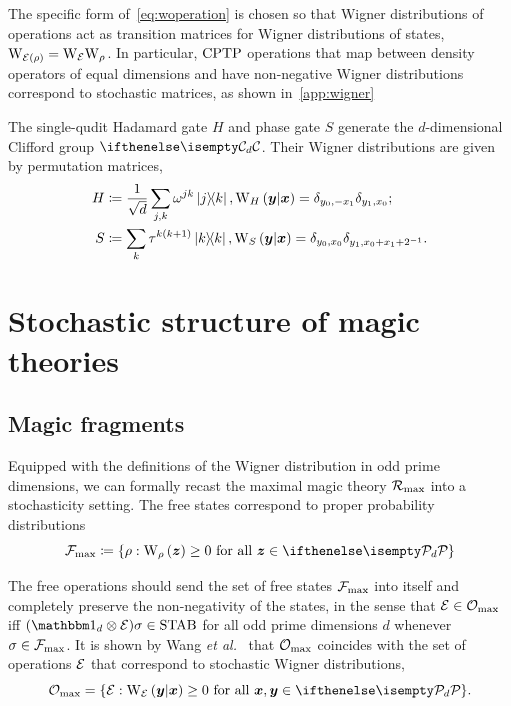 \documentclass[pra,
aps,
twocolumn,
superscriptaddress,
groupedaddress,
nofootinbib,
reprint
]{revtex4-1}
\begin{document}
The specific form of~\cref{eq:woperation} is chosen so that Wigner distributions of operations act as transition matrices for Wigner distributions of states, $\W{\E(\rho)} = \W{\E}\W{\rho}$.
In particular, ${\rm{CPTP}}$ operations that map between density operators of equal dimensions and have non-negative Wigner distributions correspond to stochastic matrices, as shown in~\cref{app:wigner}

The single-qudit Hadamard gate $H$ and phase gate $S$ generate the $d$-dimensional Clifford group $\cd$. 
Their Wigner distributions are given by permutation matrices,
\begin{align}
    H &\coloneqq \frac{1}{\sqrt{d}}\sum_{j,k} \omega^{jk} \ketbra{j}{k}, \W[\bmy|\bmx]{H} = \delta_{y_0, -x_1}\delta_{y_1, x_0};\label{eq:H}\\
    S &\coloneqq \sum_k \tau^{k(k+1)} \ketbra{k}{k}, \W[\bmy|\bmx]{S} = \delta_{y_0, x_0}\delta_{y_1, x_0 + x_1 + 2^{-1}}.\label{eq:S}
\end{align}


\section{Stochastic structure of magic theories}
\label{sec:struc}

\subsection{Magic fragments}\label{sec:magfrag}

Equipped with the definitions of the Wigner distribution in odd prime dimensions, we can formally recast the maximal magic theory $\mathcal{R}_{\rm{}max}$ into a stochasticity setting.
The free states correspond to proper probability distributions 
\begin{equation}
    \Fmax \coloneqq \{ \rho: \W[\bmz]{\rho} \geq 0 \text{ for all } \bmz \in \pd\}
\end{equation}

The free operations should send the set of free states $\mathcal{F}_{\rm{max}}$ into itself and completely preserve the non-negativity of the states, in the sense that $\mathcal{E} \in \mathcal{O}_{\rm{}max}$ iff $(\id_d \otimes \E ) \sigma \in \stab$ for all odd prime dimensions $d$ whenever $\sigma \in \mathcal{F}_{\rm{max}}$.
It is shown by Wang \textit{et al.}~\cite{cit:wang} that $\mathcal{O}_{\rm{}max}$ coincides with the set of operations $\mathcal{E}$ that correspond to stochastic Wigner distributions, 
\begin{equation}
    \Omax = \{ \E: \W[\bmy|\bmx]{\E} \geq 0 \text{ for all } \bmx, \bmy \in \pd\}.
\end{equation}
\end{document}
